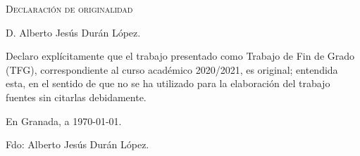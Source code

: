 %

\thispagestyle{empty}



\newpage

\hfill
\bigskip

\vspace{5cm}
\textsc{Declaración de originalidad}\\\bigskip

D. Alberto Jesús Durán López. \\\medskip

Declaro explícitamente que el trabajo presentado como Trabajo de Fin de Grado (TFG), correspondiente al curso académico 2020/2021, es original; entendida esta, en el sentido de que no se ha utilizado para la elaboración del trabajo fuentes sin citarlas debidamente.
\medskip

En Granada, a \today .
\begin{flushleft} 
Fdo: Alberto Jesús Durán López.

\end{flushleft}

\vfill

\endinput